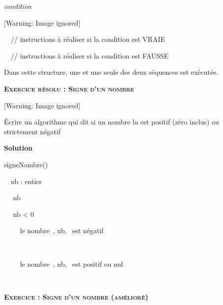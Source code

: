 {\sffamily
{} \textit{condition} }

\begin{center}
 [Warning: Image ignored] %

\end{center}
{\sffamily
\ \ // instructions à réaliser si la condition est VRAIE}

{\sffamily\bfseries\itshape
{}}

{\sffamily
\ \ // instructions à réaliser si la condition est FAUSSE}

{\sffamily
{}}

{
Dans cette structure, une et une seule des deux séquences est exécutée.}

{\sffamily\bfseries\scshape
Exercice résolu : Signe d'un nombre}

\begin{center}
 [Warning: Image ignored] %

\end{center}
{
Écrire un algorithme qui dit si un nombre lu est positif (zéro inclus)
ou strictement négatif}

{\bfseries
Solution}

{\sffamily
{} signeNombre()}

{\sffamily
\ \ nb : entier}

{\sffamily
\ \  nb}

{\sffamily
\ \  nb {\textless} 0 }

{\sffamily
\ \ \ \  {\textquotedbl}le
nombre~{\textquotedbl}, nb, {\textquotedbl}~est négatif{\textquotedbl}}

{\sffamily
\ \ }

{\sffamily
\ \ \ \  {\textquotedbl}le
nombre~{\textquotedbl}, nb, {\textquotedbl}~est positif ou
nul{\textquotedbl}}

{\sffamily
\ \  }

{\sffamily
{} }


\bigskip

{\sffamily\bfseries\scshape
Exercice : Signe d'un nombre (amélioré)}


